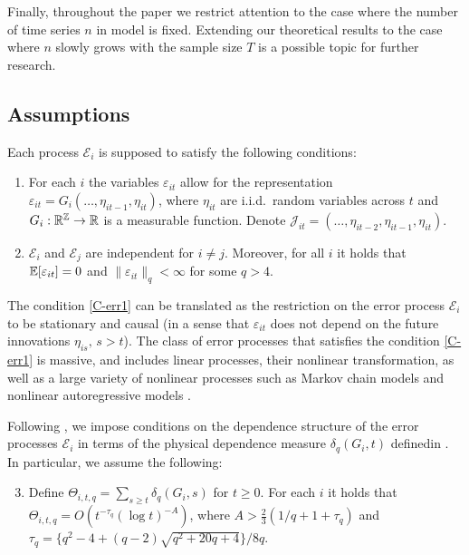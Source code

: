 \documentclass[a4paper,12pt]{article}
\makeatletter
\renewcommand{\eqref}[1]{\tagform@{\ref{#1}}}
\makeatother
\begin{document}
Finally, throughout the paper we restrict attention to the case where the number of time series $n$ in model \eqref{eq:model_full} is fixed. Extending our theoretical results to the case where $n$ slowly grows with the sample size $T$ is a possible topic for further research.

\subsection{Assumptions}\label{subsec:model_assumptions}

Each process $\mathcal{E}_i$ is supposed to satisfy the following conditions: 

\begin{enumerate}[label=(C\arabic*),leftmargin=1.05cm]

\item \label{C-err1} For each $i$ the variables $\varepsilon_{it}$ allow for the representation $\varepsilon_{it} = G_i(\ldots,\eta_{it-1},\eta_{it})$, where $\eta_{it}$ are i.i.d.\ random variables across $t$ and $G_i: \mathbb{R}^{\mathbb{Z}} \rightarrow \mathbb{R}$ is a measurable function. Denote $\mathcal{J}_{it} = (\ldots,\eta_{it-2},\eta_{it-1},\eta_{it})$.

\item \label{C-err2} $\mathcal{E}_i$ and $\mathcal{E}_j$ are independent for $i\neq j$. Moreover, for all $i$ it holds that $\mathbb{E}[\varepsilon_{it}] =0$ and $\| \varepsilon_{it} \|_q < \infty$ for some $q > 4$.
\end{enumerate}
The condition \ref{C-err1} can be translated as the restriction on the error process $\mathcal{E}_i$ to be stationary and causal (in a sense that $\varepsilon_{it}$ does not depend on the future innovations $\eta_{is},\, s >t$). The class of error processes that satisfies the condition \ref{C-err1} is massive, and includes linear processes, their nonlinear transformation, as well as a large variety of nonlinear processes such as Markov chain models and nonlinear autoregressive models \citep[][]{Wu2016}.

Following \cite{Wu2005}, we impose conditions on the dependence structure of the error processes $\mathcal{E}_i$ in terms of the physical dependence measure $\delta_q(G_i, t)$ definedin \eqref{eq:physical_dep}. In particular, we assume the following: 
\begin{enumerate}[label=(C\arabic*),leftmargin=1.05cm]
\setcounter{enumi}{2}

\item \label{C-err3} Define $\Theta_{i, t,q} = \sum\nolimits_{s \ge t} \delta_q(G_i, s)$ for $t \ge 0$. For each $i$ it holds that \linebreak
$\Theta_{i, t,q} = O ( t^{-\tau_q} (\log t)^{-A} )$,  
where $A > \frac{2}{3} (1/q + 1 + \tau_q)$ and \linebreak $\tau_q = \{q^2 - 4 + (q-2) \sqrt{q^2 + 20q + 4}\} / 8q$. 

\end{enumerate}
\end{document}
